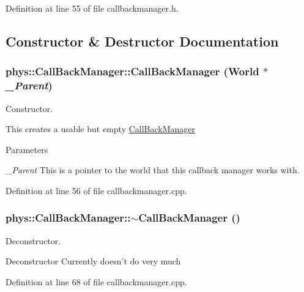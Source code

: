 Definition at line 55 of file callbackmanager.h.



\subsection{Constructor \& Destructor Documentation}
\hypertarget{classphys_1_1CallBackManager_a16d4c60beef774ae904cf01853d71aae}{
\subsubsection[{CallBackManager}]{\setlength{\rightskip}{0pt plus 5cm}phys::CallBackManager::CallBackManager ({\bf World} $\ast$ {\em \_\-Parent})}}
\label{d1/d47/classphys_1_1CallBackManager_a16d4c60beef774ae904cf01853d71aae}


Constructor. 

This creates a usable but empty \hyperlink{classphys_1_1CallBackManager}{CallBackManager} 
\begin{DoxyParams}{Parameters}
\item[{\em \_\-Parent}]This is a pointer to the world that this callback manager works with. \end{DoxyParams}


Definition at line 56 of file callbackmanager.cpp.

\hypertarget{classphys_1_1CallBackManager_a098b7a7822538aa6d6c4ba690f1e069d}{
\subsubsection[{$\sim$CallBackManager}]{\setlength{\rightskip}{0pt plus 5cm}phys::CallBackManager::$\sim$CallBackManager ()}}
\label{d1/d47/classphys_1_1CallBackManager_a098b7a7822538aa6d6c4ba690f1e069d}


Deconstructor. 

Deconstructor Currently doesn't do very much 

Definition at line 68 of file callbackmanager.cpp.




